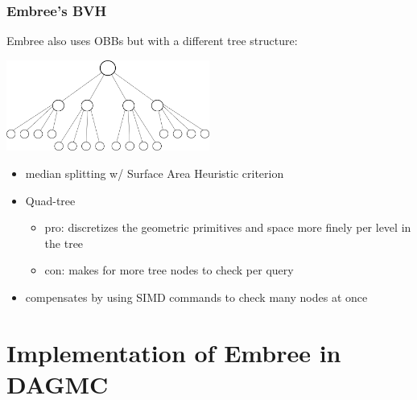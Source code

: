 \documentclass[12pt]{beamer}
\begin{document}
\begin{frame}

\frametitle{Embree's BVH}

Embree \cite{embree} also uses OBBs but with a different tree structure:

\begin{center}
\includegraphics[width=0.5\textwidth]{quad_tree.png}
\end{center}

\begin{itemize}
\item median splitting w/ Surface Area Heuristic \cite{sah} criterion 
\item Quad-tree
  \begin{itemize}
  \item pro: discretizes the geometric primitives and space more finely per level in the tree
  \item con: makes for more tree nodes to check per query
  \end{itemize}
\item compensates by using SIMD commands to check many nodes at once
\end{itemize}

\end{frame}


\section{Implementation of Embree in DAGMC} %
\end{document}
